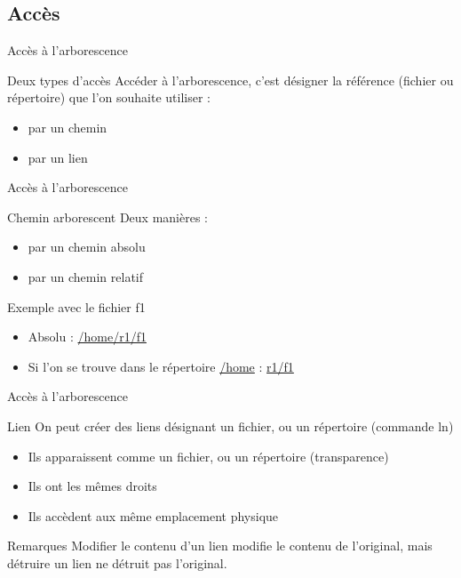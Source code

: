 \subsection{Accès}
\begin{frame}{Accès à l'arborescence}
\begin{block}{Deux types d'accès}
Accéder à l'arborescence, c'est désigner la référence (fichier ou répertoire) que l'on souhaite utiliser :
\begin{itemize}
\item par un chemin
\item par un lien
\end{itemize}
\end{block}
\end{frame}

\begin{frame}{Accès à l'arborescence}
\begin{block}{Chemin arborescent}
Deux manières :
\begin{itemize}
\item par un chemin absolu
\item par un chemin relatif
\end{itemize}
\end{block}

\begin{block}{Exemple avec le fichier f1}
\begin{itemize}
\item Absolu : \url{/home/r1/f1}
\item Si l'on se trouve dans le répertoire \url{/home} : \url{r1/f1}
\end{itemize}
\end{block}
\end{frame}

\begin{frame}{Accès à l'arborescence}
\begin{block}{Lien}
On peut créer des liens désignant un fichier, ou un répertoire (commande ln)
\begin{itemize}
\item Ils apparaissent comme un fichier, ou un répertoire (transparence)
\item Ils ont les mêmes droits
\item Ils accèdent aux même emplacement physique
\end{itemize}
\end{block}

\begin{alertblock}{Remarques}
Modifier le contenu d'un lien modifie le contenu de l'original, mais détruire un lien ne détruit pas l'original.
\end{alertblock}
\end{frame}


